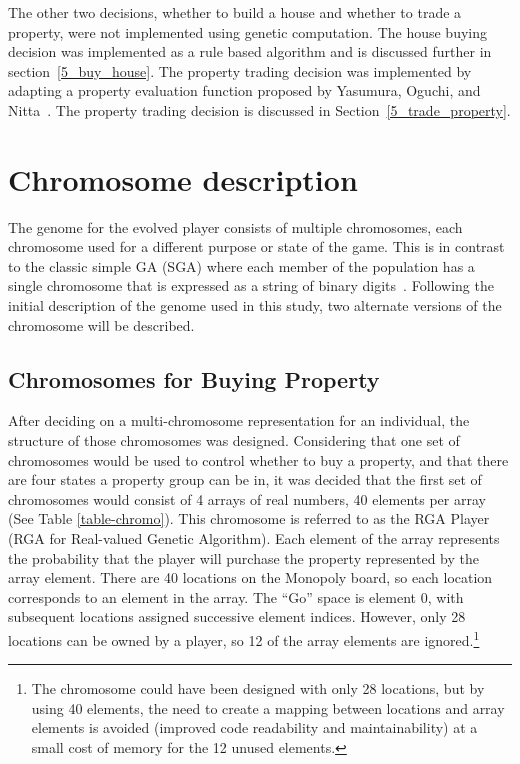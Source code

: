 The other two decisions, whether to build a house and whether to trade a
property, were not implemented using genetic computation. The house buying
decision was implemented as a rule based algorithm and is discussed further in
section~\ref{5_buy_house}. The property trading decision was implemented by
adapting a property evaluation function proposed by Yasumura, Oguchi, and
Nitta~\cite{Yasumura2001Negotiate}. The property trading decision is discussed
in Section~\ref{5_trade_property}.

\section{Chromosome description} \label{5_chromo}

The genome for the evolved player consists of multiple chromosomes, each
chromosome used for a different purpose or state of the game. This is in
contrast to the classic simple GA (SGA) where each member of the population has
a single chromosome that is expressed as a string of binary
digits~\cite{haupt2004practical}. Following the initial description of the
genome used in this study, two alternate versions of the chromosome will be
described.

\subsection{Chromosomes for Buying Property}

After deciding on a multi-chromosome representation for an individual, the
structure of those chromosomes was designed. Considering that one set of
chromosomes would be used to control whether to buy a property, and that there
are four states a property group can be in, it was decided that the first set of
chromosomes would consist of 4 arrays of real numbers, 40 elements per array
(See Table \ref{table-chromo}). This chromosome is referred to as the RGA Player
(RGA for Real-valued Genetic Algorithm). Each element of the array represents
the probability that the player will purchase the property represented by the
array element. There are 40 locations on the Monopoly board, so each location
corresponds to an element in the array. The ``Go'' space is element 0, with
subsequent locations assigned successive element indices.
However, only 28 locations can be owned by a player, so 12 of the array elements
are ignored.\footnote{The chromosome could have been designed with only 28
locations, but by using 40 elements, the need to create a mapping between
locations and array elements is avoided (improved code readability and
maintainability) at a small cost of memory for the 12 unused elements.}

